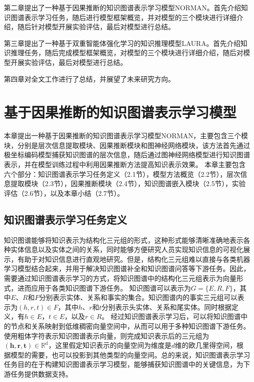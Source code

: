\documentclass[algorithmlist, AutoFakeBold, AutoFakeSlant, figurelist, tablelist, nomlist, masters]{seuthesix}
\begin{document}
第二章提出了一种基于因果推断的知识图谱表示学习模型NORMAN。首先介绍知识图谱表示学习任务，随后进行模型框架概览，并对模型的三个模块进行详细介绍，随后针对模型开展实验评估，最后对模型进行总结。

第三章提出了一种基于双重智能体强化学习的知识推理模型LAURA。首先介绍知识推理任务，随后完成模型框架概览，对模型的三个模块进行详细介绍，随后对模型开展实验评估，最后对模型进行总结。


第四章对全文工作进行了总结，并展望了未来研究方向。


\chapter{基于因果推断的知识图谱表示学习模型}
本章提出一种基于因果推断的知识图谱表示学习模型NORMAN，主要包含三个模块，分别是层次信息提取模块、因果推断模块和图神经网络模块，该方法首先通过极坐标编码模型捕获知识图谱的层次信息，随后通过图神经网络模型进行知识图谱表示，并在模型训练过程中利用因果推断方法提高知识表示效果。
本章主要包含六个部分：知识图谱表示学习任务定义（2.1节），模型方法概览（2.2节），层次信息提取模块（2.3节），因果推断模块（2.4节），知识图谱嵌入模块（2.5节），实验评估（2.6节），以及本章小结（2.7节）。

\section{知识图谱表示学习任务定义}
知识图谱能够将知识表示为结构化三元组的形式，这种形式能够清晰准确地表示各种实体信息以及实体之间的关系，同时能够方便研究人员实现知识信息的可视化展示，有助于对知识信息进行直观地研究。但是，结构化三元组难以直接与各类机器学习模型结合起来，并用于解决知识图谱补全和知识图谱问答等下游任务。因此，需要通过知识图谱表示学习的方式，将知识图谱中的结构化三元组表示为向量形式，进而应用于各类知识图谱下游任务。
知识图谱可以表示为$G=\{E, R, F\}$，其中$E$、$R$和$F$分别表示实体、关系和事实的集合。知识图谱内的事实三元组可以表示为$(h, r, t) \in F$，其中$h$、$r$和$t$分别表示头实体、关系和尾实体。同时根据定义，有$h \in E$，$t \in E$，以及$r \in R$。
经过知识图谱表示学习后，可以将知识图谱中的节点和关系映射到低维稠密向量空间中，从而可以用于多种知识图谱下游任务。使用粗体字符表示知识图谱表示向量，则完成知识表示后的三元组为$\left(\bm{h}, \bm{r}, \bm{t}\right) \in \mathbb{R}^{\mathrm{d}}$，这里假定知识表示的向量空间为维度是$d$维的欧几里得空间，根据模型的需要，也可以投影到其他类型的向量空间。总的来说，知识图谱表示学习任务目的在于构建知识图谱表示学习模型，能够捕获知识图谱中的关键信息，为下游任务提供数据支持。
\end{document}
